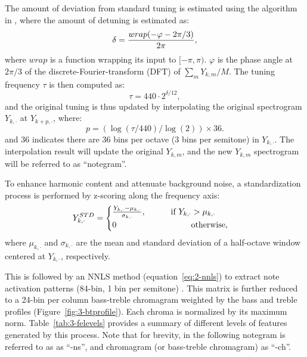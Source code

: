 The amount of deviation from standard tuning is estimated using the algorithm in \cite{dressler2007tuning}, where the amount of detuning is estimated as:
\begin{equation}\label{eq:3-tuning}
	\delta = { {wrap(-\varphi-{2\pi}/3)} \over {2\pi} },
\end{equation}
where $wrap$ is a function wrapping its input to $[-\pi,\pi)$. $\varphi$ is the phase angle at $2\pi/3$ of the discrete-Fourier-transform (DFT) of ${\sum_m Y_{k,m}} / M$. The tuning frequency $\tau$ is then computed as:
\begin{equation}
	\tau=440\cdot2^{\delta/12},
\end{equation}
and the original tuning is thus updated by interpolating the original spectrogram $Y_{k,\cdot}$ at $Y_{{k+p},\cdot}$, where:
\begin{equation}
	p = (\log(\tau / 440) / \log(2)) \times 36.
\end{equation}
and 36 indicates there are 36 bins per octave (3 bins per semitone) in $Y_{k,\cdot}$. The interpolation result will update the original $Y_{k,m}$, and the new $Y_{k,m}$ spectrogram will be referred to as ``notegram''.

To enhance harmonic content and attenuate background noise, a standardization process is performed by z-scoring along the frequency axis:
\begin{equation}
	Y^{STD}_{k,\cdot} = 
	\begin{cases}
		{{Y_{k,\cdot} - \mu_{k,\cdot}} \over \sigma_{k,\cdot}}, \text{\quad\quad\quad if } Y_{k,\cdot} > \mu_{k,\cdot}\\
		0 \quad\quad\quad\quad\quad\quad\quad\quad\quad\text{otherwise,}
	\end{cases}
\end{equation}
where $\mu_{k,\cdot}$ and $\sigma_{k,\cdot}$ are the mean and standard deviation of a half-octave window centered at $Y_{k,\cdot}$, respectively.

This is followed by an NNLS method  (equation~\ref{eq:2-nnls}) to extract note activation patterns (84-bin, 1 bin per semitone) \cite{mauch2010approximate}. This matrix is further reduced to a 24-bin per column bass-treble chromagram weighted by the bass and treble profiles (Figure~\ref{fig:3-btprofile}). Each chroma is normalized by its maximum norm. Table~\ref{tab:3-felevels} provides a summary of different levels of features generated by this process. Note that for brevity, in the following notegram is referred to as as ``-ns'', and chromagram (or bass-treble chromagram) as ``-ch''.

